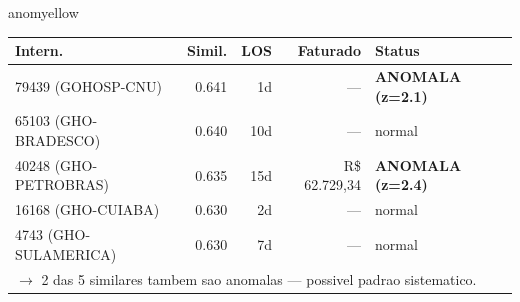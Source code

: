\documentclass[a4paper,10pt]{article}
\begin{document}
\begin{anomalycard}[Internacao 59253 | PASA | MODERADO (z=2.49)]{anomyellow}
\begin{tabular}{l r r r l}\toprule\textbf{Intern.} & \textbf{Simil.} & \textbf{LOS} & \textbf{Faturado} & \textbf{Status} \\\midrule
79439 (GOHOSP-CNU) & 0.641 & 1d & --- & \textcolor{anomred}{\textbf{ANOMALA (z=2.1)}} \\
65103 (GHO-BRADESCO) & 0.640 & 10d & --- & \textcolor{jcubeblue}{normal} \\
40248 (GHO-PETROBRAS) & 0.635 & 15d & R\$ 62.729,34 & \textcolor{anomred}{\textbf{ANOMALA (z=2.4)}} \\
16168 (GHO-CUIABA) & 0.630 & 2d & --- & \textcolor{jcubeblue}{normal} \\
4743 (GHO-SULAMERICA) & 0.630 & 7d & --- & \textcolor{jcubeblue}{normal} \\
\multicolumn{5}{l}{\textcolor{anomred}{\small $\rightarrow$ 2 das 5 similares tambem sao anomalas --- possivel padrao sistematico.}} \\
\bottomrule\end{tabular}


\end{anomalycard}

\newpage
\end{document}
